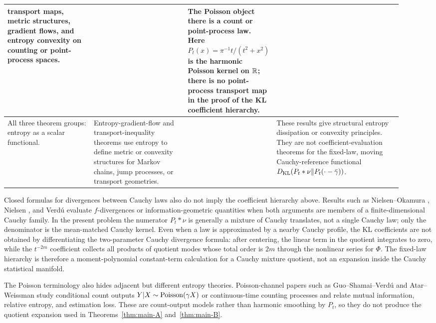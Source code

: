 {\begin{longtable}{>{\raggedright\arraybackslash}p{0.22\linewidth}|%
>{\raggedright\arraybackslash}p{0.24\linewidth}|%
>{\raggedright\arraybackslash}p{0.14\linewidth}|%
>{\raggedright\arraybackslash}p{0.32\linewidth}}
transport maps, metric structures, gradient flows, and entropy convexity on
counting or point-process spaces.
& \cite{LopezRiveraShenfeld2025PoissonTransport,
ErbarHuesmannJalowyMuller2025StationaryPointTransport}
& The Poisson object there is a count or point-process law.  Here
\(P_t(x)=\pi^{-1}t/(t^2+x^2)\) is the harmonic Poisson kernel on \(\mathbb{R}\);
there is no point-process transport map in the proof of the KL coefficient
hierarchy.\\
\hline
All three theorem groups: entropy as a scalar functional.
& Entropy-gradient-flow and transport-inequality theorems use entropy to
define metric or convexity structures for Markov chains, jump processes, or
transport geometries.
& \cite{OttoVillani2000,Maas2011EntropyMarkov,Erbar2014JumpEntropy}
& These results give structural entropy dissipation or convexity principles.
They are not coefficient-evaluation theorems for the fixed-law, moving
Cauchy-reference functional
\(D_{\rm KL}(P_t*\nu\|P_t(\cdot-\bar\gamma))\).\\
\end{longtable}
}

Closed formulas for divergences between Cauchy laws also do not imply the
coefficient hierarchy above.  Results such as Nielsen--Okamura
\cite{NielsenOkamura2023Cauchy}, Nielsen
\cite{Nielsen2020CauchyVoronoi}, and Verd{\'u}
\cite{Verdu2023Cauchy} evaluate \(f\)-divergences or information-geometric
quantities when both arguments are members of a finite-dimensional Cauchy
family.  In the present problem the numerator \(P_t*\nu\) is generally a
mixture of Cauchy translates, not a single Cauchy law; only the denominator is
the mean-matched Cauchy kernel.  Even when a law is approximated by a nearby
Cauchy profile, the KL coefficients are not obtained by differentiating the
two-parameter Cauchy divergence formula: after centering, the linear term in
the quotient integrates to zero, while the \(t^{-2m}\) coefficient collects
all products of quotient modes whose total order is \(2m\) through the
nonlinear series for \(\Phi\).  The fixed-law hierarchy is therefore a
moment-polynomial constant-term calculation for a Cauchy mixture quotient,
not an expansion inside the Cauchy statistical manifold.

The Poisson terminology also hides adjacent but different entropy theories.
Poisson-channel papers such as Guo--Shamai--Verd{\'u}
\cite{GuoShamaiVerdu2008PoissonChannel} and Atar--Weissman
\cite{AtarWeissman2012PoissonChannel} study conditional count outputs
\(Y|X\sim{\rm Poisson}(\gamma X)\) or continuous-time counting processes and
relate mutual information, relative entropy, and estimation loss.  These are
count-output models rather than harmonic smoothing by \(P_t\), so they do not
produce the quotient expansion used in Theorems~\ref{thm:main-A}
and~\ref{thm:main-B}.

